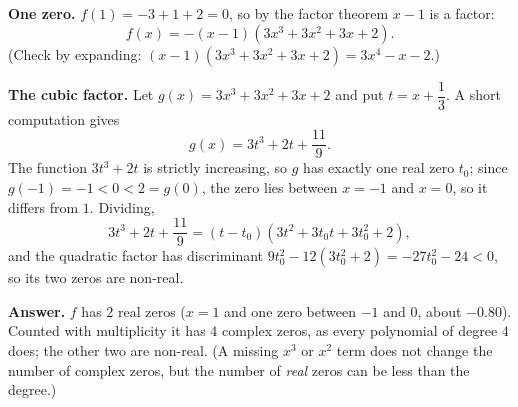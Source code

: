 \textbf{One zero.} $f(1)=-3+1+2=0$, so by the factor theorem $x-1$ is a factor:
\[f(x)=-(x-1)\left(3x^3+3x^2+3x+2\right).\]
(Check by expanding: $(x-1)(3x^3+3x^2+3x+2)=3x^4-x-2$.)

\textbf{The cubic factor.} Let $g(x)=3x^3+3x^2+3x+2$ and put $t=x+\dfrac13$. A short computation gives
\[g(x)=3t^3+2t+\dfrac{11}{9}.\]
The function $3t^3+2t$ is strictly increasing, so $g$ has exactly one real zero $t_0$; since $g(-1)=-1<0<2=g(0)$, the zero lies between $x=-1$ and $x=0$, so it differs from $1$. Dividing,
\[3t^3+2t+\dfrac{11}9=(t-t_0)\left(3t^2+3t_0t+3t_0^2+2\right),\]
and the quadratic factor has discriminant $9t_0^2-12\left(3t_0^2+2\right)=-27t_0^2-24<0$, so its two zeros are non-real.

\textbf{Answer.} $f$ has $\boxed{2}$ real zeros ($x=1$ and one zero between $-1$ and $0$, about $-0.80$). Counted with multiplicity it has $\boxed{4}$ complex zeros, as every polynomial of degree $4$ does; the other two are non-real. (A missing $x^3$ or $x^2$ term does not change the number of complex zeros, but the number of \emph{real} zeros can be less than the degree.)
